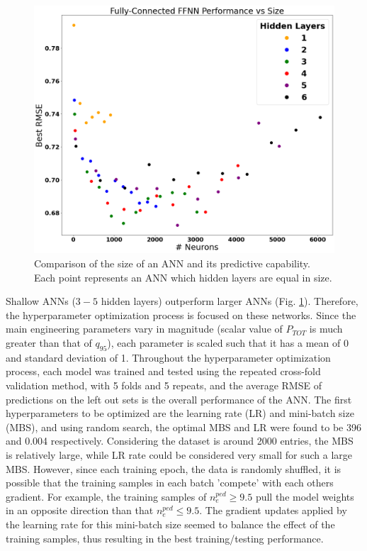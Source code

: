 \documentclass[a4paper, twoside, final, 12pt]{article}
\begin{document}
{\begin{figure}
	\centering
	\includegraphics[scale=0.2]{./src/ANN_performace_size}
	\caption{Comparison of the size of an ANN and its predictive capability. Each point represents an ANN which hidden layers are equal in size.}
	\label{fig:ANN_dim}
\end{figure}
Shallow ANNs ($3-5$ hidden layers) outperform larger ANNs (Fig. \ref{fig:ANN_dim}). Therefore, the hyperparameter optimization process is focused on these networks. Since the main engineering parameters vary in magnitude (scalar value of $P_{TOT}$ is much greater than that of $q_{95}$), each parameter is scaled such that it has a mean of 0 and standard deviation of 1. Throughout the hyperparameter optimization process, each model was trained and tested using the repeated cross-fold validation method, with 5 folds and 5 repeats, and the average RMSE of predictions on the left out sets is the overall performance of the ANN. The first hyperparameters to be optimized are the learning rate (LR) and mini-batch size (MBS), and using random search, the optimal MBS and LR were found to be 396 and 0.004 respectively. Considering the dataset is around 2000 entries, the MBS is relatively large, while LR rate could be considered very small for such a large MBS. However, since each training epoch, the data is randomly shuffled, it is possible that the training samples in each batch 'compete' with each others gradient. For example, the training samples of $n_e^{ped} \geq 9.5$ pull the model weights in an opposite direction than that $n_e^{ped} \leq 9.5$. The gradient updates applied by the learning rate for this mini-batch size seemed to balance the effect of the training samples, thus resulting in the best training/testing performance. 

}
\end{document}
